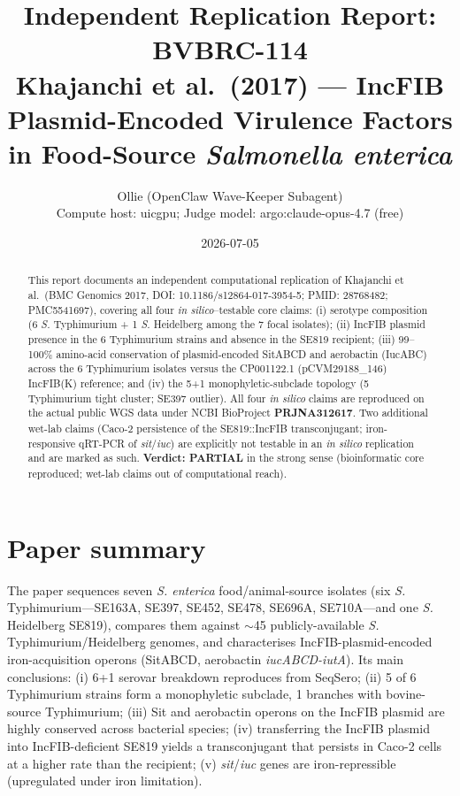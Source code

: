\documentclass[10pt]{article}
\title{Independent Replication Report: BVBRC-114 \\ \large Khajanchi et al.\ (2017) --- IncFIB Plasmid-Encoded Virulence Factors in Food-Source \emph{Salmonella enterica}}
\author{Ollie (OpenClaw Wave-Keeper Subagent) \\ \small Compute host: uicgpu; Judge model: argo:claude-opus-4.7 (free)}
\date{2026-07-05}
\begin{document}
\maketitle

\begin{abstract}
This report documents an independent computational replication of Khajanchi et al.\ (BMC Genomics 2017, DOI: 10.1186/s12864-017-3954-5; PMID: 28768482; PMC5541697), covering all four \emph{in silico}--testable core claims: (i) serotype composition (6 \emph{S.} Typhimurium + 1 \emph{S.} Heidelberg among the 7 focal isolates); (ii) IncFIB plasmid presence in the 6 Typhimurium strains and absence in the SE819 recipient; (iii) 99--100\% amino-acid conservation of plasmid-encoded SitABCD and aerobactin (IucABC) across the 6 Typhimurium isolates versus the CP001122.1 (pCVM29188\_146) IncFIB(K) reference; and (iv) the 5+1 monophyletic-subclade topology (5 Typhimurium tight cluster; SE397 outlier). All four \emph{in silico} claims are reproduced on the actual public WGS data under NCBI BioProject \textbf{PRJNA312617}. Two additional wet-lab claims (Caco-2 persistence of the SE819::IncFIB transconjugant; iron-responsive qRT-PCR of \emph{sit}/\emph{iuc}) are explicitly not testable in an \emph{in silico} replication and are marked as such. \textbf{Verdict: PARTIAL} in the strong sense (bioinformatic core reproduced; wet-lab claims out of computational reach).
\end{abstract}

\section{Paper summary}
The paper sequences seven \emph{S. enterica} food/animal-source isolates (six \emph{S.} Typhimurium---SE163A, SE397, SE452, SE478, SE696A, SE710A---and one \emph{S.} Heidelberg SE819), compares them against $\sim$45 publicly-available \emph{S.} Typhimurium/Heidelberg genomes, and characterises IncFIB-plasmid-encoded iron-acquisition operons (SitABCD, aerobactin \emph{iucABCD-iutA}). Its main conclusions: (i) 6+1 serovar breakdown reproduces from SeqSero; (ii) 5 of 6 Typhimurium strains form a monophyletic subclade, 1 branches with bovine-source Typhimurium; (iii) Sit and aerobactin operons on the IncFIB plasmid are highly conserved across bacterial species; (iv) transferring the IncFIB plasmid into IncFIB-deficient SE819 yields a transconjugant that persists in Caco-2 cells at a higher rate than the recipient; (v) \emph{sit}/\emph{iuc} genes are iron-repressible (upregulated under iron limitation).
\end{document}
